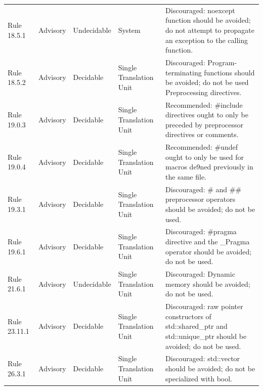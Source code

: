 \documentclass[11pt]{article}
\begin{document}
{\begin{longtable}{@{}P{2.2cm}P{1.7cm}P{2.1cm}P{3.0cm}P{6.7cm}@{}}
Rule 18.5.1 & Advisory & Undecidable & System & Discouraged: noexcept function should be avoided; do not attempt to propagate an exception to the calling function. \\
Rule 18.5.2 & Advisory & Decidable & Single Translation Unit & Discouraged: Program-terminating functions should be avoided; do not be used Preprocessing directives. \\
Rule 19.0.3 & Advisory & Decidable & Single Translation Unit & Recommended: \#include directives ought to only be preceded by preprocessor directives or comments. \\
Rule 19.0.4 & Advisory & Decidable & Single Translation Unit & Recommended: \#undef ought to only be used for macros de9ned previously in the same file. \\
Rule 19.3.1 & Advisory & Decidable & Single Translation Unit & Discouraged: \# and \#\# preprocessor operators should be avoided; do not be used. \\
Rule 19.6.1 & Advisory & Decidable & Single Translation Unit & Discouraged: \#pragma directive and the \_Pragma operator should be avoided; do not be used. \\
Rule 21.6.1 & Advisory & Undecidable & Single Translation Unit & Discouraged: Dynamic memory should be avoided; do not be used. \\
Rule 23.11.1 & Advisory & Decidable & Single Translation Unit & Discouraged: raw pointer constructors of std::shared\_ptr and std::unique\_ptr should be avoided; do not be used. \\
Rule 26.3.1 & Advisory & Decidable & Single Translation Unit & Discouraged: std::vector should be avoided; do not be specialized with bool. \\
\end{longtable}}
\end{document}
